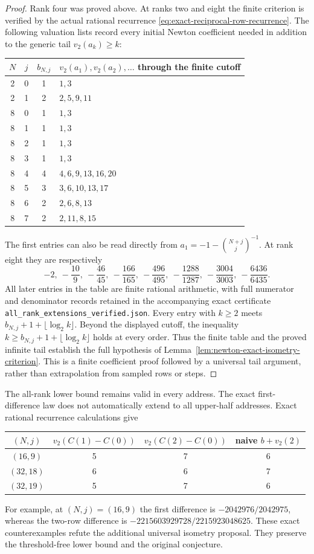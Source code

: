 \begin{proof}
Rank four was proved above. At ranks two and eight the finite
criterion is verified by the actual rational recurrence
\eqref{eq:exact-reciprocal-row-recurrence}. The following valuation
lists record every initial Newton coefficient needed in addition to
the generic tail $v_2(a_k)\geq k$:
\begin{center}
\begin{tabular}{c c c l}
$N$&$j$&$b_{N,j}$&$v_2(a_1),v_2(a_2),\ldots$ through the finite cutoff\\\hline
2&0&1&$1,3$\\
2&1&2&$2,5,9,11$\\
8&0&1&$1,3$\\
8&1&1&$1,3$\\
8&2&1&$1,3$\\
8&3&1&$1,3$\\
8&4&4&$4,6,9,13,16,20$\\
8&5&3&$3,6,10,13,17$\\
8&6&2&$2,6,8,13$\\
8&7&2&$2,11,8,15$
\end{tabular}
\end{center}
The first entries can also be read directly from
$a_1=-1-\binom{N+j}{j}^{-1}$. At rank eight they are respectively
\[
 -2,\ -\frac{10}{9},\ -\frac{46}{45},\ -\frac{166}{165},\
 -\frac{496}{495},\ -\frac{1288}{1287},\
 -\frac{3004}{3003},\ -\frac{6436}{6435}.
\]
All later entries in the table are finite rational arithmetic, with
full numerator and denominator records retained in the accompanying
exact certificate \texttt{all\_rank\_extensions\_verified.json}.
Every entry with $k\geq2$ meets
$b_{N,j}+1+\lfloor\log_2k\rfloor$. Beyond the displayed cutoff, the
inequality $k\geq b_{N,j}+1+\lfloor\log_2k\rfloor$ holds at every
order. Thus the finite table and the proved infinite tail establish
the full hypothesis of Lemma~\ref{lem:newton-exact-isometry-criterion}.
This is a finite coefficient proof followed by a universal tail
argument, rather than extrapolation from sampled rows or steps.
\end{proof}

\begin{remark}
The all-rank lower bound remains valid in every address. The exact
first-difference law does not automatically extend to all upper-half
addresses. Exact rational recurrence calculations give
\begin{center}
\begin{tabular}{c c c c}
$(N,j)$&$v_2(C(1)-C(0))$&$v_2(C(2)-C(0))$&naive $b+v_2(2)$\\\hline
$(16,9)$&5&7&6\\
$(32,18)$&6&6&7\\
$(32,19)$&5&7&6
\end{tabular}
\end{center}
For example, at $(N,j)=(16,9)$ the first difference is
$-2042976/2042975$, whereas the two-row difference is
$-2215603929728/2215923048625$. These exact counterexamples refute
the additional universal isometry proposal. They preserve the
threshold-free lower bound and the original conjecture.
\end{remark}

